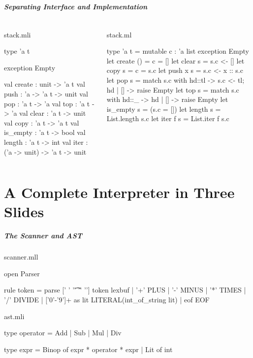 \documentclass{plt}
\begin{document}
\begin{frame}[fragile]
  \frametitle{Separating Interface and Implementation}

\begin{columns}
  \begin{column}[t]{0.5\textwidth}
stack.mli
\medskip
\begin{ocaml}
type 'a t

exception Empty

val create : unit -> 'a t
val push : 'a -> 'a t -> unit
val pop : 'a t -> 'a
val top : 'a t -> 'a
val clear : 'a t -> unit
val copy : 'a t -> 'a t
val is_empty : 'a t -> bool
val length : 'a t -> int
val iter : ('a -> unit) ->
                 'a t -> unit
\end{ocaml}
  \end{column}
  \begin{column}[t]{0.5\textwidth}
stack.ml
\medskip
\begin{ocaml}
type 'a t =
   { mutable c : 'a list }
exception Empty
let create () = { c = [] }
let clear s = s.c <- []
let copy s = { c = s.c }
let push x s = s.c <- x :: s.c
let pop s =
  match s.c with
    hd::tl -> s.c <- tl; hd
  | []     -> raise Empty
let top s =
  match s.c with
    hd::_ -> hd
  | []    -> raise Empty
let is_empty s = (s.c = [])
let length s = List.length s.c
let iter f s = List.iter f s.c
\end{ocaml}
  \end{column}
\end{columns}

\end{frame}

\part{A Complete Interpreter in Three Slides}

\begin{frame}[fragile]
  \frametitle{The Scanner and AST}
scanner.mll


\begin{ocamllex}
{ open Parser }

rule token =
  parse [' ' '\t' '\r' '\n'] { token lexbuf }
      | '+'                  { PLUS }
      | '-'                  { MINUS }
      | '*'                  { TIMES }
      | '/'                  { DIVIDE }
      | ['0'-'9']+ as lit    { LITERAL(int_of_string lit) }
      | eof                  { EOF }
\end{ocamllex}


ast.mli


\begin{ocaml}
type operator = Add | Sub | Mul | Div

type expr =
    Binop of expr * operator * expr
  | Lit of int
\end{ocaml}

\end{frame}
\end{document}
